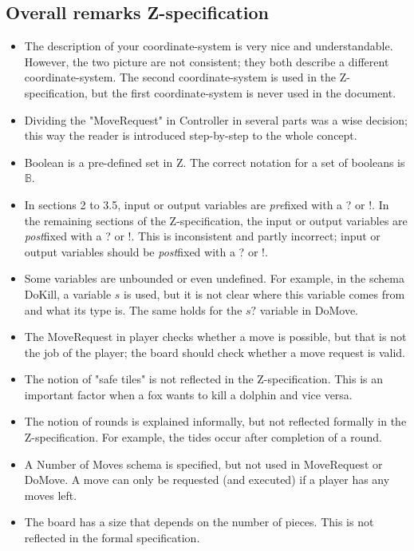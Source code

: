 \documentclass[a4paper,11pt]{article}
\begin{document}
    \subsection{Overall remarks Z-specification}
    \begin{itemize}
        \item The description of your coordinate-system is very nice and understandable. However, the two picture are not consistent; they both describe a different coordinate-system. The second coordinate-system is used in the Z-specification, but the first coordinate-system is never used in the document.
        \item Dividing the "MoveRequest" in Controller in several parts was a wise decision; this way the reader is introduced step-by-step to the whole concept.
        \item Boolean is a pre-defined set in Z. The correct notation for a set of booleans is $\mathds{B}$.
        \item In sections 2 to  3.5, input or output variables are \emph{pre}fixed with a ? or !. In the remaining sections of the Z-specification, the input or output variables are \emph{post}fixed with a ? or !. This is inconsistent and partly incorrect; input or output variables should be \emph{post}fixed with a ? or !.
        \item Some variables are unbounded or even undefined. For example, in the schema DoKill, a variable $s$ is used, but it is not clear where this variable comes from and what its type is. The same holds for the $s?$ variable in DoMove.
        \item The MoveRequest in player checks whether a move is possible, but that is not the job of the player; the board should check whether a move request is valid.
        \item The notion of "safe tiles" is not reflected in the Z-specification. This is an important factor when a fox wants to kill a dolphin and vice versa.
        \item The notion of rounds is explained informally, but not reflected formally in the Z-specification. For example, the tides occur after completion of a round.
        \item A Number of Moves schema is specified, but not used in MoveRequest or DoMove. A move can only be requested (and executed) if a player has any moves left.
        \item The board has a size that depends on the number of pieces. This is not reflected in the formal specification.

\end{itemize}
\end{document}
